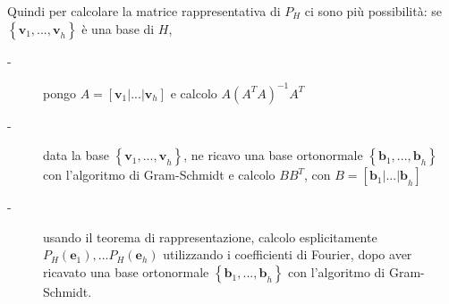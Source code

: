 \documentclass{article}
\begin{document}
Quindi per calcolare la matrice rappresentativa di $P_{H}$ ci sono pi\`{u}
possibilit\`{a}: se $\left\{ \mathbf{v}_{1}\mathbf{,...,v}_{h}\right\} $ 
\`{e} una base di $H$,

\begin{description}
\item[-] pongo $A=\left[ \mathbf{v}_{1}|...|\mathbf{v}_{h}\right] $ e
calcolo $A\left( A^{T}A\right) ^{-1}A^{T}$

\item[-] data la base $\left\{ \mathbf{v}_{1}\mathbf{,...,v}_{h}\right\} $,
ne ricavo una base ortonormale $\left\{ \mathbf{b}_{1}\mathbf{,...,b}%
_{h}\right\} $ con l'algoritmo di Gram-Schmidt e calcolo $BB^{T}$, con $B=%
\left[ \mathbf{b}_{1}|\mathbf{...|b}_{h}\right] $

\item[-] usando il teorema di rappresentazione, calcolo esplicitamente $%
P_{H}\left( \mathbf{e}_{1}\right) ,...P_{H}\left( \mathbf{e}_{h}\right) $
utilizzando i coefficienti di Fourier, dopo aver ricavato una base
ortonormale $\left\{ \mathbf{b}_{1}\mathbf{,...,b}_{h}\right\} $ con
l'algoritmo di Gram-Schmidt.
\end{description}
\end{document}
